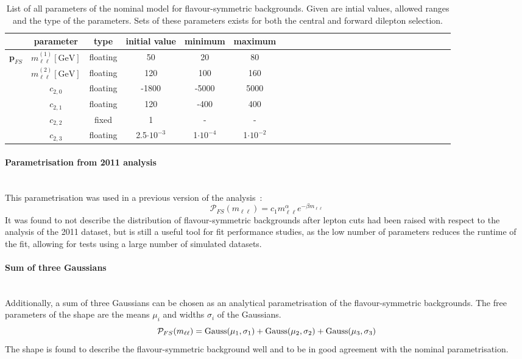 \begin{table}[htbp]
\begin{center}
 \renewcommand{\arraystretch}{1.3}
 \caption{List of all parameters of the nominal model for flavour-symmetric backgrounds. Given are intial values, allowed ranges and the type of the parameters. Sets of these parameters exists for both the central and forward dilepton selection.\label{tab:Fit_Par_Overview_FS}}
\begin{tabular}{l|c|c|c|c|ccccccccccccccccccccc}
& parameter & type & initial value & minimum & maximum \\ \hline
\multirow{5}{*}{$\mathbf{p}_{FS}$} & $m_{\ell\ell}^{(1)} [\mathrm{GeV}]$ & floating & 50 & 20 & 80 \\ 
& $m_{\ell\ell}^{(2)}  [\mathrm{GeV}]$ & floating & 120 & 100 & 160 \\
& $c_{2,0}$ & floating & -1800 & -5000 & 5000 \\ 
& $c_{2,1}$ & floating & 120 & -400 & 400 \\
& $c_{2,2}$ & fixed & 1 & - & - \\
& $c_{2,3}$ & floating & 2.5$\cdot10^{-3}$ & 1$\cdot10^{-4}$ & 1$\cdot10^{-2}$ \\
\end{tabular}

\end{center}
\end{table}


\paragraph{Parametrisation from 2011 analysis}\mbox{} \\
This parametrisation was used in a previous version of the analysis~\cite{edge2011}: 
\begin{equation*}
 \mathcal{P}_{FS}(m_{\ell\ell}) = c_{1} m_{\ell\ell}^{\alpha} e^{-\beta m_{\ell\ell}}
\end{equation*}
It was found to not describe the distribution of flavour-symmetric backgrounds after lepton \pt cuts had been raised with respect to the analysis of the 2011 dataset, but is still a useful tool for fit performance studies, as the low number of parameters reduces the runtime of the fit, allowing for tests using a large number of simulated datasets.
\paragraph{Sum of three Gaussians}\mbox{} \\
Additionally, a sum of three Gaussians can be chosen as an analytical parametrisation of the flavour-symmetric backgrounds. The free parameters of the shape are the means $\mu_i$ and widths $\sigma_i$ of the Gaussians.
\begin{equation*}
\mathcal{P}_{FS}(m_{\ell\ell}) = \mathrm{Gauss}(\mu_1,\sigma_1) + \mathrm{Gauss}(\mu_2,\sigma_2) + \mathrm{Gauss}(\mu_3,\sigma_3)\\
\end{equation*}
The shape is found to describe the flavour-symmetric background well and to be in good agreement with the nominal parametrisation.
